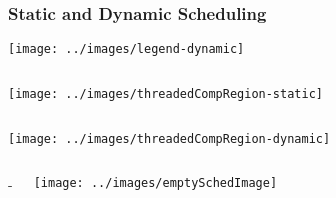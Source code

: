 \begin{frame}
\frametitle{Static and Dynamic Scheduling}
\texttt{[image: ../images/legend-dynamic]} \\
\begin{columns}
  
  \begin{center}
    \texttt{[image: ../images/threadedCompRegion-static]} \\
  \end{center} 
\end{columns}
\begin{columns}

  \begin{center}
    \texttt{[image: ../images/threadedCompRegion-dynamic]}\\
  \end{center}
\end{columns}

\begin{columns}
- 
  \begin{center}
    \texttt{[image: ../images/emptySchedImage]}
  \end{center}
\end{columns}
\end{frame}

